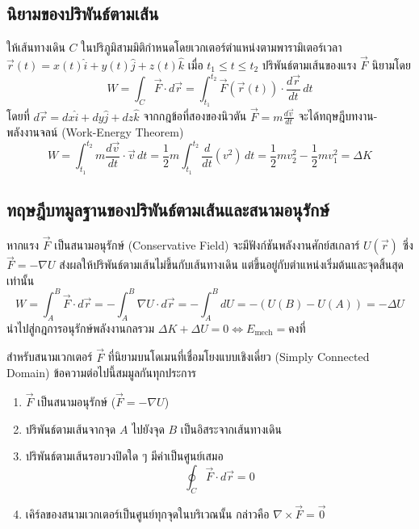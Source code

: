 \subsection{นิยามของปริพันธ์ตามเส้น}
ให้เส้นทางเดิน $C$ ในปริภูมิสามมิติกำหนดโดยเวกเตอร์ตำแหน่งตามพารามิเตอร์เวลา $\vec{r}(t) = x(t)\hat{i} + y(t)\hat{j} + z(t)\hat{k}$ เมื่อ $t_1 \le t \le t_2$ ปริพันธ์ตามเส้นของแรง $\vec{F}$ นิยามโดย
\begin{equation}
W = \int_C \vec{F} \cdot d\vec{r} = \int_{t_1}^{t_2} \vec{F}(\vec{r}(t)) \cdot \frac{d\vec{r}}{dt} \, dt
\end{equation}
โดยที่ $d\vec{r} = dx\hat{i} + dy\hat{j} + dz\hat{k}$ จากกฎข้อที่สองของนิวตัน $\vec{F} = m\frac{d\vec{v}}{dt}$ จะได้ทฤษฎีบทงาน-พลังงานจลน์ (Work-Energy Theorem)
\begin{equation}
W = \int_{t_1}^{t_2} m\frac{d\vec{v}}{dt} \cdot \vec{v} \, dt = \frac{1}{2}m \int_{t_1}^{t_2} \frac{d}{dt}(v^2) \, dt = \frac{1}{2}mv_2^2 - \frac{1}{2}mv_1^2 = \Delta K
\end{equation}

\subsection{ทฤษฎีบทมูลฐานของปริพันธ์ตามเส้นและสนามอนุรักษ์}
หากแรง $\vec{F}$ เป็นสนามอนุรักษ์ (Conservative Field) จะมีฟังก์ชันพลังงานศักย์สเกลาร์ $U(\vec{r})$ ซึ่ง $\vec{F} = -\nabla U$ ส่งผลให้ปริพันธ์ตามเส้นไม่ขึ้นกับเส้นทางเดิน แต่ขึ้นอยู่กับตำแหน่งเริ่มต้นและจุดสิ้นสุดเท่านั้น
\begin{equation}
W = \int_A^B \vec{F} \cdot d\vec{r} = -\int_A^B \nabla U \cdot d\vec{r} = -\int_A^B dU = -(U(B) - U(A)) = -\Delta U
\end{equation}
นำไปสู่กฎการอนุรักษ์พลังงานกลรวม $\Delta K + \Delta U = 0 \iff E_{\text{mech}} = \text{คงที่}$

\begin{maththeorem}
สำหรับสนามเวกเตอร์ $\vec{F}$ ที่นิยามบนโดเมนที่เชื่อมโยงแบบเชิงเดี่ยว (Simply Connected Domain) ข้อความต่อไปนี้สมมูลกันทุกประการ
\begin{enumerate}
    \item $\vec{F}$ เป็นสนามอนุรักษ์ ($\vec{F} = -\nabla U$)
    \item ปริพันธ์ตามเส้นจากจุด $A$ ไปยังจุด $B$ เป็นอิสระจากเส้นทางเดิน
    \item ปริพันธ์ตามเส้นรอบวงปิดใด ๆ มีค่าเป็นศูนย์เสมอ
    \begin{equation}
    \oint_C \vec{F} \cdot d\vec{r} = 0
    \end{equation}
    \item เคิร์ลของสนามเวกเตอร์เป็นศูนย์ทุกจุดในบริเวณนั้น กล่าวคือ $\nabla \times \vec{F} = \vec{0}$
\end{enumerate}
\end{maththeorem}

